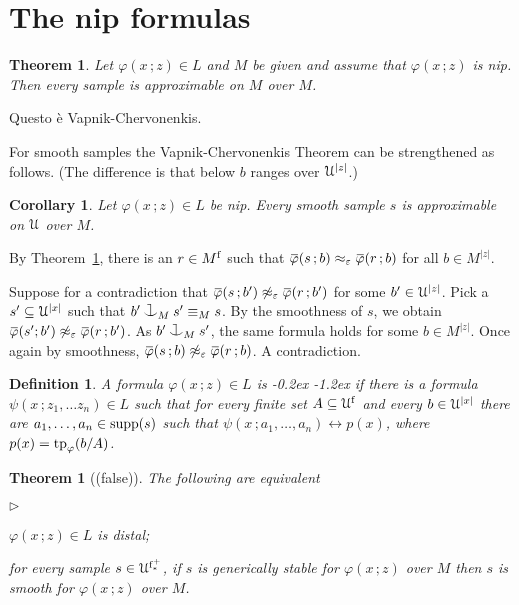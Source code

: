 \documentclass[10pt,openany]{article}
\newcommand{\mylabel}[1]{{\ssf{#1}}\hfill}
\renewenvironment{itemize}
  {\begin{list}{$\triangleright$}{%
   \setlength{\parskip}{0mm}
   \setlength{\topsep}{.4\baselineskip}
   \setlength{\rightmargin}{0mm}
   \setlength{\listparindent}{0mm}
   \setlength{\itemindent}{0mm}
   \setlength{\labelwidth}{3ex}
   \setlength{\itemsep}{.4\baselineskip}
   \setlength{\parsep}{0mm}
   \setlength{\partopsep}{0mm}
   \setlength{\labelsep}{1ex}
   \setlength{\leftmargin}{\labelwidth+\labelsep}
   \let\makelabel\mylabel}}{%
   \end{list}\vspace*{-\parskip}}
\def\supp{\mathop{\rm supp}}
\def\tp{{\rm tp}}
\newcommand{\sbar}[1]{\mkern 1.8mu\overline{\mkern-1.8mu#1\mkern-1mu}\mkern 1mu}
\def\cnonfork{\mathbin{\raise1.8ex\rlap{\kern0.6ex\rule{0.6ex}{0.1ex}}
\rlap{\kern1.1ex\rule{0.1ex}{1.9ex}}\raise-0.3ex\hbox{$\smile$} } }
\def\iff{\leftrightarrow}
\def\U{\EuScript U}
\def\phi{\varphi}
\def\epsilon{\varepsilon}
\def\ssf#1{\textsf{\small #1}}
\newcounter{thm}[section]
\theoremstyle{mio}
\newtheorem{theorem}[thm]{Theorem}
\newtheorem{corollary}[thm]{Corollary}
\newtheorem{definition}[thm]{Definition}
\theoremstyle{liscio}
\def\QED{\noindent\nolinebreak[4]\hspace{\stretch{1}}\rlap{\ \ $\Box$}\medskip}
\renewenvironment{proof}[1][Proof]%
{\begin{trivlist}\item[\hskip\labelsep {\bf #1}]}
{\QED\end{trivlist}}
\renewcommand*{\emph}[1]{%
   \kern-0.2ex 
   \smash{\tikz[baseline]
   \node[ rectangle, fill=emphcolor, rounded corners, 
          inner xsep=.3ex, inner ysep=.2ex, anchor=base,
          minimum height = 3ex
         ]{#1};
   }
   \kern-1.2ex 
}
\begin{document}
\section{The nip formulas}\label{nip}

\begin{theorem}\label{thm_VC}
  Let $\phi(x\,;z)\in L$ and $M$ be given and assume that $\phi(x\,;z)$ is nip.
  Then every sample is approximable on $M$ over $M$.
\end{theorem}

\begin{proof}
  Questo è Vapnik-Chervonenkis.
\end{proof}

For smooth samples the Vapnik-Chervonenkis Theorem can be strengthened as follows. (The difference is that below $b$ ranges over $\U^{|z|}$.)

\begin{corollary}
  Let  $\phi(x\,;z)\in L$ be nip.
  Every smooth sample $s$ is approximable on $\U$ over $M$.
\end{corollary}

\begin{proof}
  By Theorem~\ref{thm_VC}, there is an $r\in M^{\rm f}$ such that $\sbar\phi(s\,;b)\approx_\epsilon\sbar\phi(r\,;b)$ for all $b\in M^{|z|}$.
  
  Suppose for a contradiction that $\sbar\phi(s\,;b')\not\approx_\epsilon\sbar\phi(r\,;b')$ for some $b'\in\U^{|z|}$.
  Pick a  $s'\subseteq\U^{|x|}$ such that $b'\cnonfork_{M}s'\equiv_Ms$.
  By the smoothness of $s$, we obtain $\sbar\phi(s';b')\not\approx_\epsilon\sbar\phi(r\,;b')$.
  As $b'\cnonfork_{M}s'$, the same formula holds for some $b\in M^{|z|}$.
  Once again by smoothness, $\sbar\phi(s\,;b)\not\approx_\epsilon\sbar\phi(r\,;b)$.
  A contradiction.
\end{proof}

\begin{definition}
  A formula $\phi(x\,;z)\in L$ is \emph{distal\/} if there is a formula $\psi(x\,;z_1,\dots z_n)\in L$ such that for every finite set $A\subseteq\U^{\rm f}$ and every $b\in\U^{|x|}$ there are $a_1,\dots,a_n\in \supp(s)$ such that $\psi(x\,;a_1,\dots,a_n)\iff p(x)$, where $p(x)=\tp_\phi(b/A)$.\QED
\end{definition}

\begin{theorem}[(false)]
  The following are equivalent
  \begin{itemize}
    \item[1.] $\phi(x\,;z)\in L$ is distal;
    \item[2.] for every sample $s\in\U^{\rm f^+_*}$, if $s$ is generically stable for $\phi(x\,;z)$ over $M$ then $s$ is smooth for $\phi(x\,;z)$ over $M$.
  \end{itemize}
\end{theorem}
\end{document}
